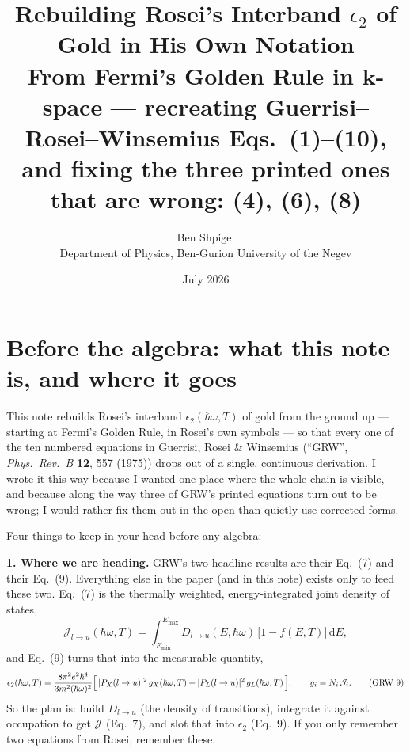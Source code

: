 \documentclass[11pt,a4paper]{article}
\title{\bfseries Rebuilding Rosei's Interband $\epsilon_2$ of Gold in
His Own Notation\\[4pt]
\large From Fermi's Golden Rule in $\mathbf{k}$-space --- recreating
Guerrisi--Rosei--Winsemius Eqs.~(1)--(10), \\ and fixing the three
printed ones that are wrong: \textcolor{BrickRed}{(4), (6), (8)}}
\author{Ben Shpigel\\ \small Department of Physics, Ben-Gurion University of the Negev}
\date{July 2026}
\numberwithin{equation}{section}
\newcommand{\hw}{\hbar\omega}
\newcommand{\cJ}{\mathcal{J}}%
\newcommand{\dd}{\mathrm{d}}
\begin{document}
\maketitle

\section*{Before the algebra: what this note is, and where it goes}

This note rebuilds Rosei's interband $\epsilon_2(\hw,T)$ of gold from
the ground up --- starting at Fermi's Golden Rule, in Rosei's own
symbols --- so that every one of the ten numbered equations in
Guerrisi, Rosei \& Winsemius (``GRW'', \emph{Phys.\ Rev.\ B}
\textbf{12}, 557 (1975)) drops out of a single, continuous derivation.
I wrote it this way because I wanted one place where the whole chain is
visible, and because along the way three of GRW's printed equations
turn out to be wrong; I would rather fix them out in the open than
quietly use corrected forms.

Four things to keep in your head before any algebra:

\medskip
\noindent\textbf{1. Where we are heading.} GRW's two headline results
are their Eq.~(7) and their Eq.~(9). Everything else in the paper
(and in this note) exists only to feed these two. Eq.~(7) is the
thermally weighted, energy-integrated joint density of states,
\begin{equation*}
\cJ_{l\to u}(\hw,T)=\int_{E_{\min}}^{E_{\max}}
D_{l\to u}(E,\hw)\,\bigl[1-f(E,T)\bigr]\,\dd E ,
\tag{GRW~7}
\end{equation*}
and Eq.~(9) turns that into the measurable quantity,
\begin{equation*}
\epsilon_2(\hw,T)=\frac{8\pi^2 e^2\hbar^4}{3m^2(\hw)^2}
\Bigl[\,|P_X(l\to u)|^2\,g_X(\hw,T)
      +|P_L(l\to u)|^2\,g_L(\hw,T)\,\Bigr],
\qquad g_i=N_i\,\cJ_i .
\tag{GRW~9}
\end{equation*}
So the plan is: build $D_{l\to u}$ (the density of transitions),
integrate it against occupation to get $\cJ$ (Eq.~7), and slot that
into $\epsilon_2$ (Eq.~9). If you only remember two equations from
Rosei, remember these.
\end{document}
